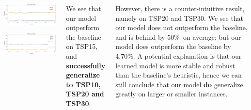 \documentclass[20pt,,margin=1in,innermargin=-4.5in,blockverticalspace=-0.25in]{tikzposter}
\begin{document}
\begin{columns}
{\begin{center}
\begin{minipage}{0.49\linewidth}
\begin{tikzfigure}
				\end{tikzfigure}%
			\end{minipage}\hfill
			\begin{minipage}{0.49\linewidth}
				\centering
				\begin{tikzfigure}
					\includegraphics[width=13cm]{Figures/result/15-25.png}
				\end{tikzfigure}%
			\end{minipage}
			\includegraphics[width=27cm]{Figures/result/15-30(from15-15).png}
		\end{center}
		We see that our model outperform the baseline on TSP15, and \textbf{successfully generalize to TSP10, TSP20
			and TSP30}.

		However, there is a counter-intuitive result, namely on TSP20 and TSP30. We see that our model does not
		outperform the baseline, and is behind by 50\%\ on average; but our model does outperform the baseline
		by 4.70\%. A potential explanation is that our learned model is more stable and robust than the
		baseline's heuristic, hence we can still conclude that our model \textbf{do} generalize greatly on larger
		or smaller instances.
	}

\end{columns}
\end{document}
